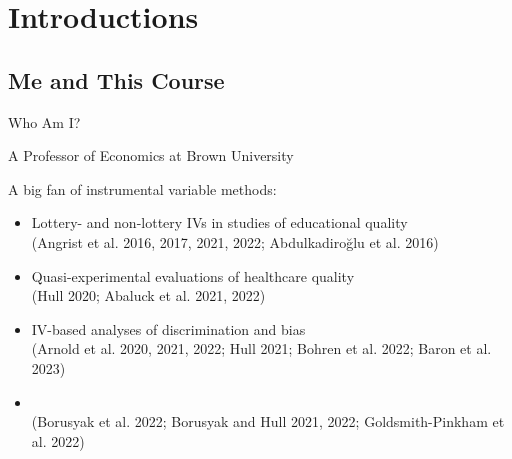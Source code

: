 \documentclass[t]{beamer}
\begin{document}
\setlength{\abovedisplayskip}{5pt}
\setlength{\belowdisplayskip}{5pt}
\setlength{\abovedisplayshortskip}{5pt}
\setlength{\belowdisplayshortskip}{5pt}


\section{Introductions}

\subsection{Me and This Course}
\begin{frame}{Who Am I?}

A Professor of Economics at Brown University\pause

A big fan of instrumental variable methods:\pause
\begin{itemize}
  \item Lottery- and non-lottery IVs in studies of educational quality \\ {\scriptsize \textcolor{red!75!green!50!blue!25!gray}{(Angrist et al. 2016, 2017, 2021, 2022; Abdulkadiro\u{g}lu et al. 2016)}}
  \item Quasi-experimental evaluations of healthcare quality \\ {\scriptsize \textcolor{red!75!green!50!blue!25!gray}{(Hull 2020; Abaluck et al. 2021, 2022)}}
  \item IV-based analyses of discrimination and bias \\ {\scriptsize \textcolor{red!75!green!50!blue!25!gray}{(Arnold et al. 2020, 2021, 2022; Hull 2021; Bohren et al. 2022; Baron et al. 2023)}}

  \item {} \\ {\scriptsize \textcolor{red!75!green!50!blue!25!gray}{(Borusyak et al. 2022; Borusyak and Hull 2021, 2022; Goldsmith-Pinkham et al. 2022)}}
\end{itemize}

\end{frame}
\end{document}
